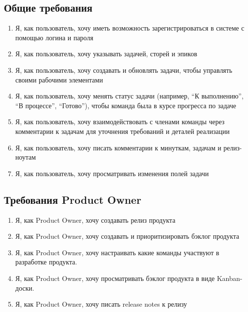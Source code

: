 \documentclass{article}
\begin{document}
\subsection{Общие требования}
\begin{enumerate}[label=\textbf{FR\arabic*}.]
	\item Я, как пользователь, хочу иметь возможность зарегистрироваться в системе с помощью логина и пароля
	\item Я, как пользователь, хочу указывать  задачей, сторей и эпиков
	\item Я, как пользователь, хочу создавать и обновлять задачи, чтобы управлять своими рабочими элементами
	\item Я, как пользователь, хочу менять статус задачи (например, ``К выполнению'', ``В процессе'', ``Готово''), чтобы команда была в курсе прогресса по задаче
	\item Я, как пользователь, хочу взаимодействовать с членами команды через комментарии к задачам для уточнения требований и деталей реализации
	\item Я, как пользователь, хочу писать комментарии к минуткам, задачам и релиз-ноутам
	\item Я, как пользователь, хочу просматривать изменения полей задачи
\end{enumerate}

\subsection{Требования Product Owner}
\begin{enumerate}[label=\textbf{POR\arabic*}.]
	\item Я, как Product Owner, хочу создавать релиз продукта
	\item Я, как Product Owner, хочу создавать и приоритизировать бэклог продукта
	\item Я, как Product Owner, хочу настраивать какие команды участвуют в разработке продукта.
	\item Я, как Product Owner, хочу просматривать бэклог продукта в виде Kanban-доски.
	\item Я, как Product Owner, хочу писать release notes к релизу
\end{enumerate}
\end{document}
